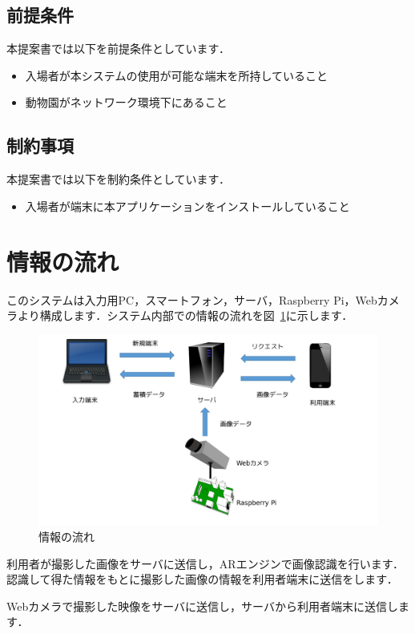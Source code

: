 \documentclass[a4j]{jarticle}
\begin{document}
\subsection{前提条件}
本提案書では以下を前提条件としています．
\begin{itemize}
	\item 入場者が本システムの使用が可能な端末を所持していること
	\item 動物園がネットワーク環境下にあること
\end{itemize}

\subsection{制約事項}
本提案書では以下を制約条件としています．
\begin{itemize}
	\item 入場者が端末に本アプリケーションをインストールしていること
\end{itemize}

\section{情報の流れ}
このシステムは入力用PC，スマートフォン，サーバ，Raspberry Pi，Webカメラより構成します．システム内部での情報の流れを図~\ref{data_nagare}に示します．

\begin{figure}[H]
	\begin{center}
		\includegraphics[width=0.8 \linewidth]{data_nagare_2.png}
		\caption{情報の流れ}
		\label{data_nagare}
	\end{center}
\end{figure}

利用者が撮影した画像をサーバに送信し，ARエンジンで画像認識を行います．認識して得た情報をもとに撮影した画像の情報を利用者端末に送信をします．

Webカメラで撮影した映像をサーバに送信し，サーバから利用者端末に送信します．
\end{document}
